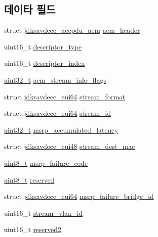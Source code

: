 \subsection*{데이타 필드}
\begin{DoxyCompactItemize}
\item 
struct \hyperlink{structjdksavdecc__aecpdu__aem}{jdksavdecc\+\_\+aecpdu\+\_\+aem} \hyperlink{structjdksavdecc__aem__command__set__stream__info_ae1e77ccb75ff5021ad923221eab38294}{aem\+\_\+header}
\item 
uint16\+\_\+t \hyperlink{structjdksavdecc__aem__command__set__stream__info_ab7c32b6c7131c13d4ea3b7ee2f09b78d}{descriptor\+\_\+type}
\item 
uint16\+\_\+t \hyperlink{structjdksavdecc__aem__command__set__stream__info_a042bbc76d835b82d27c1932431ee38d4}{descriptor\+\_\+index}
\item 
\hyperlink{parse_8c_a6eb1e68cc391dd753bc8ce896dbb8315}{uint32\+\_\+t} \hyperlink{structjdksavdecc__aem__command__set__stream__info_a01e6193642f6392292ade676656c9118}{aem\+\_\+stream\+\_\+info\+\_\+flags}
\item 
struct \hyperlink{structjdksavdecc__eui64}{jdksavdecc\+\_\+eui64} \hyperlink{structjdksavdecc__aem__command__set__stream__info_a77359be54ea386b1da66597746709ed0}{stream\+\_\+format}
\item 
struct \hyperlink{structjdksavdecc__eui64}{jdksavdecc\+\_\+eui64} \hyperlink{structjdksavdecc__aem__command__set__stream__info_af4c017686a11885d1d514c21bcde8160}{stream\+\_\+id}
\item 
\hyperlink{parse_8c_a6eb1e68cc391dd753bc8ce896dbb8315}{uint32\+\_\+t} \hyperlink{structjdksavdecc__aem__command__set__stream__info_a58ec17b43515ffd62f6380695f8f59b2}{msrp\+\_\+accumulated\+\_\+latency}
\item 
struct \hyperlink{structjdksavdecc__eui48}{jdksavdecc\+\_\+eui48} \hyperlink{structjdksavdecc__aem__command__set__stream__info_acb9f6beb748e2b0e9086f809a4b3143d}{stream\+\_\+dest\+\_\+mac}
\item 
\hyperlink{stdint_8h_aba7bc1797add20fe3efdf37ced1182c5}{uint8\+\_\+t} \hyperlink{structjdksavdecc__aem__command__set__stream__info_ad3d0b0a294bb35f39b361259730159d7}{msrp\+\_\+failure\+\_\+code}
\item 
\hyperlink{stdint_8h_aba7bc1797add20fe3efdf37ced1182c5}{uint8\+\_\+t} \hyperlink{structjdksavdecc__aem__command__set__stream__info_acb7bc06bed6f6408d719334fc41698c7}{reserved}
\item 
struct \hyperlink{structjdksavdecc__eui64}{jdksavdecc\+\_\+eui64} \hyperlink{structjdksavdecc__aem__command__set__stream__info_ad53a697054b76cf96ebb0d69a8cf8fb8}{msrp\+\_\+failure\+\_\+bridge\+\_\+id}
\item 
uint16\+\_\+t \hyperlink{structjdksavdecc__aem__command__set__stream__info_a8901fae0712dfce7341cdcbe8b43035c}{stream\+\_\+vlan\+\_\+id}
\item 
uint16\+\_\+t \hyperlink{structjdksavdecc__aem__command__set__stream__info_a0fc429b055e74830a4583ec37f5c3846}{reserved2}
\end{DoxyCompactItemize}


